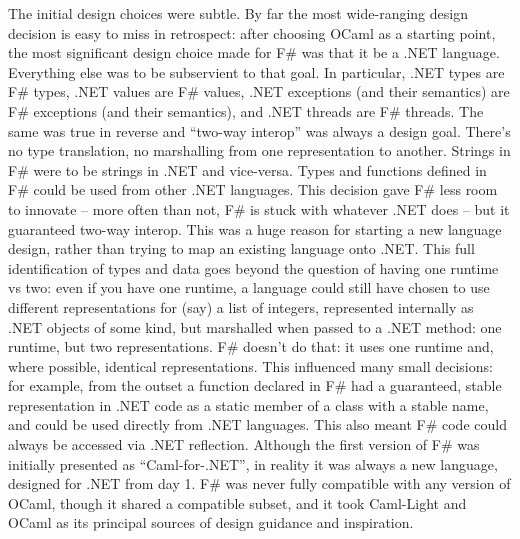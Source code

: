 \documentclass[acmsmall,review]{acmart}\settopmatter{printfolios=true,printccs=false,printacmref=false}
\begin{document}
The initial design choices were subtle.  By far the most wide-ranging design decision is easy to miss in retrospect: after choosing OCaml as a starting point, the most significant design choice made for F\# was that it be a .NET language.  Everything else was to be subservient to that goal.  In particular, .NET types are F\# types, .NET values are F\# values, .NET exceptions (and their semantics) are F\# exceptions (and their semantics), and .NET threads are F\# threads.  The same was true in reverse and “two-way interop” was always a design goal.  There’s no type translation, no marshalling from one representation to another. Strings in F\# were to be strings in .NET and vice-versa.  Types and functions defined in F\# could be used from other .NET languages. This decision gave F\# less room to innovate – more often than not, F\# is stuck with whatever .NET does – but it guaranteed two-way interop.  This was a huge reason for starting a new language design, rather than trying to map an existing language onto .NET.  This full identification of types and data goes beyond the question of having one runtime vs two: even if you have one runtime, a language could still have chosen to use different representations for (say) a list of integers, represented internally as .NET objects of some kind, but marshalled when passed to a .NET method: one runtime, but two representations. F\# doesn’t do that: it uses one runtime and, where possible, identical representations. This influenced many small decisions: for example, from the outset a function declared in F\# had a guaranteed, stable representation in .NET code as a static member of a class with a stable name, and could be used directly from .NET languages.  This also meant F\# code could always be accessed via .NET reflection.  Although the first version of F\# was initially presented as “Caml-for-.NET”, in reality it was always a new language, designed for .NET from day 1. F\# was never fully compatible with any version of OCaml, though it shared a compatible subset, and it took Caml-Light and OCaml as its principal sources of design guidance and inspiration.  
\end{document}
